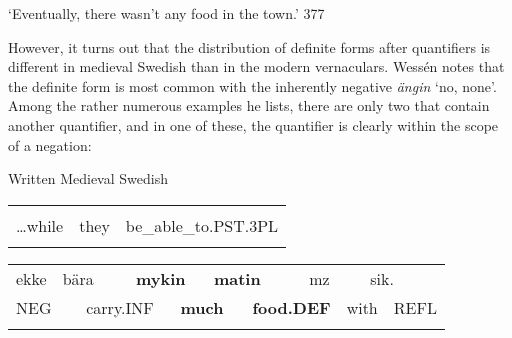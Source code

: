 \begin{styleTranslation}
‘Eventually, there wasn’t any food in the town.’ 377

\end{styleTranslation}

\begin{styleBodyTextFirst}
However, it turns out that the distribution of definite forms after quantifiers is different in medieval Swedish than in the modern vernaculars. Wessén notes that the definite form is most common with the inherently negative \textit{ängin} ‘no, none’. Among the rather numerous examples he lists, there are only two that contain another quantifier, and in one of these, the quantifier is clearly within the scope of a negation: 

\end{styleBodyTextFirst}

\begin{listWWNumileveli}
\item {}

\begin{styleExample}
Written Medieval Swedish

\end{styleExample}

\end{listWWNumileveli}

\begin{tabular}{lll}
\lsptoprule
\multicolumn{3}{l}{…medhan

}\\
…while & they & be\_able\_to.PST.3PL\\
\lspbottomrule
\end{tabular}

\begin{tabular}{llllllllllll}
\lsptoprule
ekke & \multicolumn{2}{l}{bära

} & \multicolumn{2}{l}{{\bfseries mykin}

} & \multicolumn{2}{l}{{\bfseries matin}

} & \multicolumn{2}{l}{mz

} & \multicolumn{2}{l}{sik.

} & \\
\multicolumn{2}{l}{NEG

} & \multicolumn{2}{l}{carry.INF

} & \multicolumn{2}{l}{{\bfseries much}

} & \multicolumn{2}{l}{{\bfseries food.DEF}

} & \multicolumn{2}{l}{with

} & \multicolumn{2}{l}{REFL

}\\
\lspbottomrule
\end{tabular}

